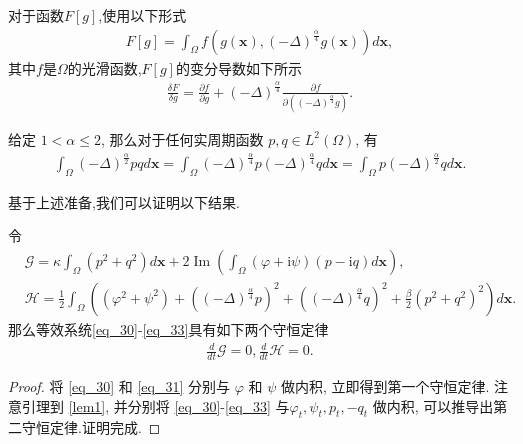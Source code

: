 \cite{wangStructurepreservingNumericalMethods2018}\begin{lemma}\label{lem2}
对于函数$F[g]$,使用以下形式
\begin{align}\label{eq_25}
F[g]=\int_{\Omega} f\left(g(\boldsymbol{x}),(-\Delta)^{\frac{\alpha}{4}} g(\boldsymbol{x})\right) d \boldsymbol{x},
\end{align}
其中$f$是$\Omega$的光滑函数,$F[g]$的变分导数如下所示
\begin{align}\label{eq_26}
\frac{\delta F}{\delta g}=\frac{\partial f}{\partial g}+(-\Delta)^{\frac{\alpha}{4}} \frac{\partial f}{\partial\left((-\Delta)^{\frac{\alpha}{4}} g\right)} .
\end{align}
\end{lemma}

\begin{lemma}\label{lem1}
 给定 $1<\alpha \leq 2$, 那么对于任何实周期函数 $p, q \in L^{2}(\Omega)$, 有
\begin{align}\label{eq_22}
\int_{\Omega}(-\Delta)^{\frac{\alpha}{2}} p q d \boldsymbol{x}=\int_{\Omega}(-\Delta)^{\frac{\alpha}{4}} p(-\Delta)^{\frac{\alpha}{4}} q d \boldsymbol{x}=\int_{\Omega} p(-\Delta)^{\frac{\alpha}{2}} q d \boldsymbol{x}.
\end{align}
\end{lemma}


基于上述准备,我们可以证明以下结果.
\begin{theorem}	\label{thm2_1}
令
\begin{align}
&\mathcal{G}=\kappa\int_{\Omega}(p^2+q^2) d \boldsymbol{x}+2\operatorname{Im}(\int_{\Omega}(\varphi+\mathrm{i}\psi)(p-\mathrm{i}q)d \boldsymbol{x}),\label{eq_34} \\
&\mathcal{H}=\frac{1}{2}\int_{\Omega}\left((\varphi^2+\psi^2)+\left((-\Delta)^{\frac{\alpha}{4}} p\right)^{2}+\left((-\Delta)^{\frac{\alpha}{4}} q\right)^{2}+\frac{\beta}{2}(p^2+q^2)^{2}\right) d \boldsymbol{x}.\label{eq_35}
\end{align}
那么等效系统\eqref{eq_30}-\eqref{eq_33}具有如下两个守恒定律
\begin{align}
\frac{d}{d t} \mathcal{G}=0, \frac{d}{d t} \mathcal{H}=0.
\end{align}
\end{theorem}

\begin{proof}
将 \eqref{eq_30} 和 \eqref{eq_31} 分别与 $\varphi$ 和 $\psi$ 做内积, 立即得到第一个守恒定律.
注意引理到 \ref{lem1}, 并分别将 \eqref{eq_30}-\eqref{eq_33} 与$\varphi_{t}, \psi_{t}, p_{t},-q_{t}$ 做内积, 可以推导出第二守恒定律.证明完成.
\end{proof}

